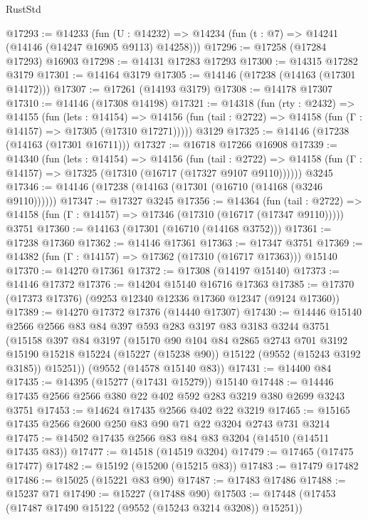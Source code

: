 \begin{lexlean}{RustStd}
\begin{coremodule}
@17293 := @14233
    (fun (U : @14232) => @14234 (fun (t : @7) => @14241 (@14146 (@14247 @16905 @9113) @14258)))
@17296 := @17258 (@17284 @17293) @16903
@17298 := @14131 @17283 @17293
@17300 := @14315 @17282 @3179
@17301 := @14164 @3179
@17305 := @14146 (@17238 (@14163 (@17301 @14172)))
@17307 := @17261 (@14193 @3179)
@17308 := @14178 @17307
@17310 := @14146 (@17308 @14198)
@17321 := @14318
    (fun (rty : @2432) =>
    @14155
      (fun (lets : @14154) =>
      @14156 (fun (tail : @2722) => @14158 (fun (Γ : @14157) => @17305 (@17310 @17271)))))
    @3129
@17325 := @14146 (@17238 (@14163 (@17301 @16711)))
@17327 := @16718 @17266 @16908
@17339 := @14340
    (fun (lets : @14154) =>
    @14156
      (fun (tail : @2722) =>
      @14158 (fun (Γ : @14157) => @17325 (@17310 (@16717 (@17327 @9107 @9110))))))
    @3245
@17346 := @14146 (@17238 (@14163 (@17301 (@16710 (@14168 (@3246 @9110))))))
@17347 := @17327 @3245
@17356 := @14364
    (fun (tail : @2722) => @14158 (fun (Γ : @14157) => @17346 (@17310 (@16717 (@17347 @9110)))))
    @3751
@17360 := @14163 (@17301 (@16710 (@14168 @3752)))
@17361 := @17238 @17360
@17362 := @14146 @17361
@17363 := @17347 @3751
@17369 := @14382 (fun (Γ : @14157) => @17362 (@17310 (@16717 @17363))) @15140
@17370 := @14270 @17361
@17372 := @17308 (@14197 @15140)
@17373 := @14146 @17372
@17376 := @14204 @15140 @16716 @17363
@17385 := @17370 (@17373 @17376) (@9253 @12340 @12336 @17360 @12347 (@9124 @17360))
@17389 := @14270 @17372 @17376 (@14440 @17307)
@17430 := @14446
    @15140
    @2566
    @2566
    @83
    @84
    @397
    @593
    @283
    @3197
    @83
    @3183
    @3244
    @3751
    (@15158
      @397
      @84
      @3197
      (@15170
        @90
        @104
        @84
        @2865
        @2743
        @701
        @3192
        @15190
        @15218
        @15224
        (@15227 (@15238 @90))
        @15122
        (@9552 (@15243 @3192 @3185))
        @15251))
    (@9552 (@14578 @15140 @83))
@17431 := @14400 @84
@17435 := @14395 (@15277 (@17431 @15279)) @15140
@17448 := @14446 @17435 @2566 @2566 @380 @22 @402 @592 @283 @3219 @380 @2699 @3243 @3751
@17453 := @14624 @17435 @2566 @402 @22 @3219
@17465 := @15165 @17435 @2566 @2600 @250 @83 @90 @71 @22 @3204 @2743 @731 @3214
@17475 := @14502 @17435 @2566 @83 @84 @83 @3204 (@14510 (@14511 @17435 @83))
@17477 := @14518 (@14519 @3204)
@17479 := @17465 (@17475 @17477)
@17482 := @15192 (@15200 (@15215 @83))
@17483 := @17479 @17482
@17486 := @15025 (@15221 @83 @90)
@17487 := @17483 @17486
@17488 := @15237 @71
@17490 := @15227 (@17488 @90)
@17503 := @17448
    (@17453 (@17487 @17490 @15122 (@9552 (@15243 @3214 @3208)) @15251))

\end{coremodule}
\end{lexlean}
